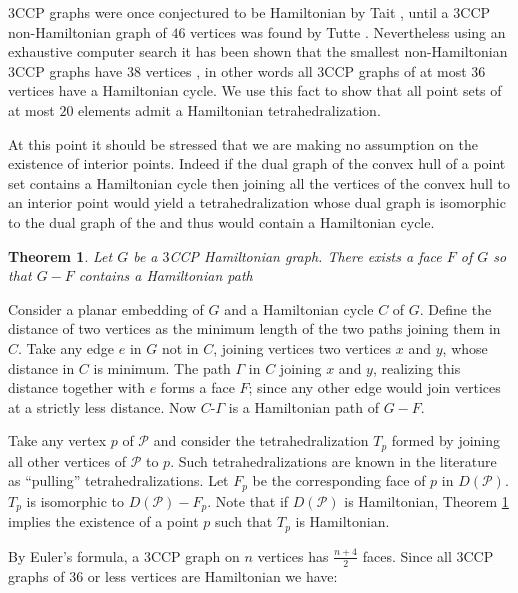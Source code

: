 \documentclass{article}
\newtheorem{theorem}{Theorem}
\def\QED{\ensuremath{{\square}}}
\def\markatright#1{\leavevmode\unskip\nobreak\quad\hspace*{\fill}{#1}}
\newenvironment{proof}
  {\begin{trivlist}\item[\hskip\labelsep{\bf Proof.}]}
  {\markatright{\QED}\end{trivlist}}
\begin{document}
$3$CCP graphs were once conjectured to be Hamiltonian by Tait \cite{tait}, until a
$3$CCP non-Hamiltonian graph of 
$46$ vertices was found by Tutte \cite{tutte}. Nevertheless
using an exhaustive computer search it has been shown that the smallest non-Hamiltonian $3$CCP graphs have $38$ vertices \cite{nonham}, in other words all $3$CCP graphs of at most 36 vertices
have a Hamiltonian cycle.
We use this fact to show that all point sets of at most $20$ elements admit
a Hamiltonian tetrahedralization.\par

At this point it should be stressed that we are making no assumption
on the existence of interior points. Indeed if the dual graph of the
convex hull of a point set contains a Hamiltonian cycle then joining all the vertices
of the convex hull to an interior point would yield a tetrahedralization whose dual graph
is isomorphic to the dual graph of the  and thus would contain a Hamiltonian cycle.

\begin{theorem}\label{eyeham}
Let $G$ be a $3$CCP Hamiltonian graph. There exists a face $F$ 
of $G$ so that $G-F$ contains a Hamiltonian path
\end{theorem}
\begin{proof}

Consider a planar embedding of $G$ and a Hamiltonian
cycle $C$ of $G$. Define the distance of two vertices 
as the minimum length of the two paths joining them in $C$.
Take any edge $e$ in $G$ not in $C$, joining vertices two vertices $x$ and $y$,
 whose distance in $C$ is minimum. The path $\Gamma$ in $C$ joining $x$ and $y$, realizing this
distance together with $e$ forms a face $F$; since any other edge
would join vertices at a strictly less distance.
Now $C$-$\Gamma$ is a Hamiltonian path of $G-F$.
\end{proof}

Take any vertex $p$ of $\mathcal{P}$ and consider the tetrahedralization
$T_p$ formed by joining all other vertices of $\mathcal{P}$ to $p$.
Such tetrahedralizations are known in the literature as ``pulling'' tetrahedralizations.
Let $F_p$ be the corresponding face of $p$ in $D(\mathcal{P})$. $T_p$ is 
isomorphic to $D(\mathcal{P})-F_p$. Note that if $D(\mathcal{P})$ is Hamiltonian, 
Theorem \ref{eyeham} implies the existence of a point $p$ such that $T_p$ is Hamiltonian.\par

By Euler's formula, a $3$CCP graph on $n$ vertices has $\frac{n+4}{2}$ faces.
Since all $3$CCP graphs of $36$ or less vertices are Hamiltonian we have:
\end{document}
